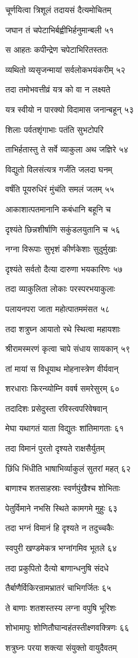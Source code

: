 चूर्णयित्वा त्रिशूलं तदायसं दैत्यमोचितम्

जघान तं चपेटाभिर्बह्वीभिर्हनुमान्बली ५१

स आहतः कपीन्द्रेण चपेटाभिरितस्ततः

व्यथितो व्यसृजन्मायां सर्वलोकभयंकरीम् ५२

तदा तमोभवत्तीव्रं यत्र को वा न लक्ष्यते

यत्र स्वीयो न पारक्यो विदामास जनान्बहून् ५३

शिलाः पर्वतशृंगाभाः पतंति सुभटोपरि

ताभिर्हतास्तु ते सर्वे व्याकुला अथ जज्ञिरे ५४

विद्युतो विलसंत्यत्र गर्जंति जलदा घनम्

वर्षंति पूयरुधिरं मुंचंति समलं जलम् ५५

आकाशात्पतमानानि कबंधानि बहूनि च

दृश्यंते छिन्नशीर्षाणि सकुंडलयुतानि च ५६

नग्ना विरूपाः सुभृशं कीर्णकेशाः सुदुर्मुखाः

दृश्यंते सर्वतो दैत्या दारुणा भयकारिणः ५७

तदा व्याकुलिता लोकाः परस्परभयाकुलाः

पलायनपरा जाता महोत्पातममंसत ५८

तदा शत्रुघ्न आयातो रथे स्थित्वा महायशाः

श्रीरामस्मरणं कृत्वा चापे संधाय सायकान् ५९

तां मायां स विधूयाथ मोहनास्त्रेण वीर्यवान्

शरधाराः किरन्व्योम्नि ववर्ष समरेसुरम् ६०

तदादिशः प्रसेदुस्ता रविस्त्वपरिवेषवान्

मेघा यथागतं याता विद्युतः शांतिमागताः ६१

तदा विमानं पुरतो दृश्यते राक्षसैर्युतम्

छिंधि भिंधीति भाषाभिर्व्याकुलं सुतरां महत् ६२

बाणाश्च शतसाहस्राः स्वर्णपुंखैश्च शोभिताः

पेतुर्विमाने नभसि स्थिते कामगमे मुहुः ६३

तदा भग्नं विमानं हि दृश्यते न तदुच्चकैः

स्वपुरी खण्डमेकत्र भग्नांगमिव भूतले ६४

तदा प्रकुपितो दैत्यो बाणान्धनुषि संदधे

तैर्बाणैर्विकिरन्रामभ्रातरं चाभिगर्जितः ६५

ते बाणाः शतशस्तस्य लग्ना वपुषि भूरिशः

शोभामापुः शोणितौघान्वहंतस्तीक्ष्णवक्त्रिणः ६६

शत्रुघ्नः परया शक्त्या संयुक्तो वायुदैवतम्

